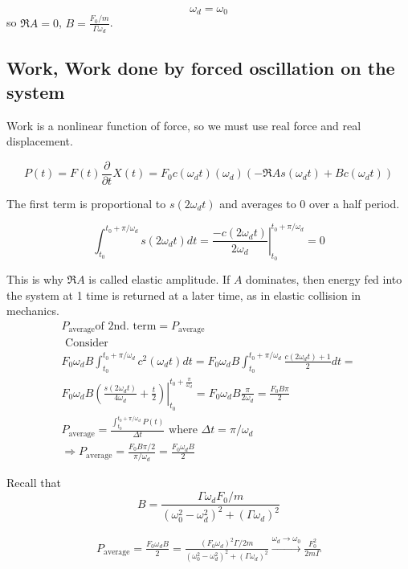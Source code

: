 \[
\omega_d = \omega_0
\]
so $\Re{A} = 0$, $B = \frac{ F_0 / m}{ \Gamma \omega_d}$.

\subsection{Work, Work done by forced oscillation on the system}

Work is a nonlinear function of force, so we must use real force and real displacement.

\[
P(t) = F(t) \frac{\partial }{\partial t} X(t) = F_0 c(\omega_d t) (\omega_d) (-\Re{A} s(\omega_d t) + B c(\omega_d t))
\]

The first term is proportional to $s(2\omega_d t)$ and averages to 0 over a half period.

\[
\int_{t_0}^{t_0 + \pi / \omega_d} s(2\omega_d t) dt = \left. \frac{ -c(2\omega_d t) }{2 \omega_d } \right|_{t_0}^{t_0 + \pi /\omega_d} = 0
\]

This is why $\Re{A}$ is called elastic amplitude. If $A$ dominates, then energy fed into the system at 1 time is returned at a later time, as in elastic collision in mechanics.
\[
\begin{gathered}
	P_{\text{average}} \text{of 2nd. term} = P_{\text{average}} \\
	\text{ Consider } \\
	F_0 \omega_d B \int_{t_0}^{t_0 + \pi/ \omega_d} c^2 (\omega_d t) dt = F_0 \omega_d B \int_{t_0}^{t_0 + \pi/ \omega_d} \frac{ c(2\omega_d t) + 1}{2} dt = \\
	F_0 \omega_d B \left. \left( \frac{ s(2\omega_d t) }{ 4 \omega_d } + \frac{t}{2} \right) \right|_{t_0}^{t_0 + \frac{\pi}{\omega_d} } = F_0 \omega_d B \frac{\pi}{2\omega_d} = \frac{F_0 B\pi}{2} \\
	P_{\text{average}} = \frac{ \int_{t_0}^{t_0 + \pi / \omega_d} P(t) }{ \Delta t}  \text{ where } \Delta t = \pi / \omega_d \\
	\Longrightarrow P_{\text{average}} = \frac{ F_0 B\pi /2}{ \pi / \omega_d}  = \boxed{ \frac{F_0 \omega_d B}{2} }
\end{gathered}
\]

Recall that
\[
B = \frac{ \Gamma \omega_d F_0 /m }{ (\omega_0^2 - \omega_d^2)^2 + (\Gamma \omega_d)^2 }
\]

\[
\begin{gathered}
	P_{\text{average}} = \frac{F_0 \omega_d B}{2} = \frac{ (F_0 \omega_d)^2 \Gamma /2m }{ (\omega_0^2 - \omega_d^2)^2 + (\Gamma \omega_d)^2 } \xrightarrow{ \omega_d\to \omega_0} \frac{F_0^2}{ 2m \Gamma}
\end{gathered}
\]

